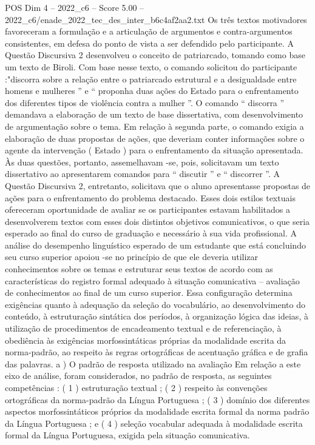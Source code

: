 \begin{textsample}{POS Dim 4 – 2022\_c6 – Score 5.00 – 2022\_c6/enade\_2022\_tec\_des\_inter\_b6c4af2aa2.txt}
Os três textos motivadores favoreceram a formulação e a articulação de argumentos e contra-argumentos consistentes, em defesa do ponto de vista a ser defendido pelo participante.
A Questão Discursiva 2 desenvolveu o conceito de patriarcado, tomando como base um texto de Biroli.
Com base nesse texto, o comando solicitou do participante :"discorra sobre a relação entre o patriarcado estrutural e a desigualdade entre homens e mulheres ” e “ proponha duas ações do Estado para o enfrentamento dos diferentes tipos de violência contra a mulher ”.
O comando “ discorra ” demandava a elaboração de um texto de base dissertativa, com desenvolvimento de argumentação sobre o tema.
Em relação à segunda parte, o comando exigia a elaboração de duas propostas de ações, que deveriam conter informações sobre o agente da intervenção ( Estado ) para o enfrentamento da situação apresentada.
Às duas questões, portanto, assemelhavam -se, pois, solicitavam um texto dissertativo ao apresentarem comandos para “ discutir ” e “ discorrer ”.
A Questão Discursiva 2, entretanto, solicitava que o aluno apresentasse propostas de ações para o enfrentamento do problema destacado.
Esses dois estilos textuais ofereceram oportunidade de avaliar se os participantes estavam habilitados a desenvolverem textos com esses dois distintos objetivos comunicativos, o que seria esperado ao final do curso de graduação e necessário à sua vida profissional.
A análise do desempenho linguístico esperado de um estudante que está concluindo seu curso superior apoiou -se no princípio de que ele deveria utilizar conhecimentos sobre os temas e estruturar seus textos de acordo com as características do registro formal adequado à situação comunicativa – avaliação de conhecimentos ao final de um curso superior.
Essa configuração determina exigências quanto à adequação da seleção do vocabulário, ao desenvolvimento do conteúdo, à estruturação sintática dos períodos, à organização lógica das ideias, à utilização de procedimentos de encadeamento textual e de referenciação, à obediência às exigências morfossintáticas próprias da modalidade escrita da norma-padrão, ao respeito às regras ortográficas de acentuação gráfica e de grafia das palavras. a ) O padrão de resposta utilizado na avaliação Em relação a este eixo de análise, foram considerados, no padrão de resposta, as seguintes competências : ( 1 ) estruturação textual ; ( 2 ) respeito às convenções ortográficas da norma-padrão da Língua Portuguesa ; ( 3 ) domínio dos diferentes aspectos morfossintáticos próprios da modalidade escrita formal da norma padrão da Língua Portuguesa ; e ( 4 ) seleção vocabular adequada à modalidade escrita formal da Língua Portuguesa, exigida pela situação comunicativa.

\end{textsample}
